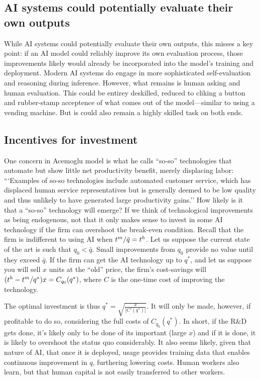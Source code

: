 \documentclass{article}
\theoremstyle{plain}
\theoremstyle{plain}
\begin{document}
\subsection{AI systems could potentially evaluate their own outputs}
While AI systems could potentially evaluate their own outputs, this misses a key point: if an AI model could reliably improve its own evaluation process, those improvements likely would already be incorporated into the model's training and deployment.
Modern AI systems do engage in more sophisticated self-evaluation and reasoning during inference. 
However, what remains is human asking and human evaluation.
This could be entirey deskilled, reduced to cliking a button and rubber-stamp acceptence of what comes out of the model---similar to using a vending machine.
But is could also remain a highly skilled task on both ends.

\subsection{Incentives for investment}
One concern in Acemoglu model is what he calls ``so-so'' technologies that automate but show little net productivity benefit, merely displacing labor: ```Examples of so-so technologies include automated customer service, which has displaced human service representatives but is generally deemed to be low quality and thus unlikely to have generated large productivity gains.''
How likely is it that a ``so-so'' technology will emerge?
If we think of technological improvements as being endogenous, not that it only makes sense to invest in some AI technology if the firm can overshoot the break-even condition. 
Recall that the firm is indifferent to using AI when $t^{m}_{} / \bar{q} = t^{h}_{}$. 
Let us suppose the current state of the art is such that $q_0 < \bar{q}$.
Small improvements from $q_0$ provide no value until they exceed $\bar{q}$. 
If the firm can get the AI technology up to $q^*$, and let us suppose you will sell $x$ units at the ``old'' price, 
the firm's cost-savings will $(t^{h}_{} - t^{m}_{} / q^*) x = C_{q_0}(q^*)$, where $C$ is the one-time cost of improving the technology.

The optimal investment is thus $q^* = \sqrt{\frac{x}{|C'(q^*)|}}$.
It will only be made, however, if profitable to do so, considering the full costs of $C_{q_0}(q^*)$.
In short, if the R\&D gets done, it's likely only to be done of its important (large $x$) and if it is done, it is likely to overshoot the status quo considerably.  
It also seems likely, given that nature of AI, that once it is deployed, usage provides training data that enables continuous improvement in $q$, furthering lowering costs. 
Human workers also learn, but that human capital is not easily transferred to other workers. 
\end{document}
